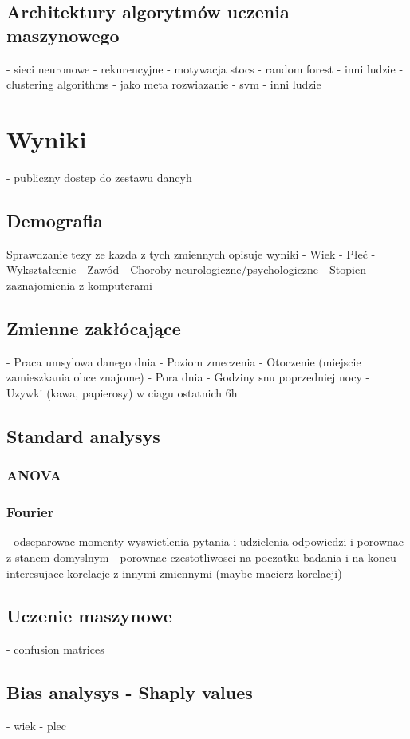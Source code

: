 \documentclass{./assets/wfis}
\begin{document}
\section{Architektury algorytmów uczenia maszynowego}
- sieci neuronowe
    - rekurencyjne - motywacja stocs
- random forest - inni ludzie
- clustering algorithms - jako meta rozwiazanie
- svm - inni ludzie

\chapter{Wyniki}
- publiczny dostep do zestawu dancyh
\section{Demografia}
Sprawdzanie tezy ze kazda z tych zmiennych opisuje wyniki
- Wiek
- Płeć
- Wykształcenie
- Zawód
- Choroby neurologiczne/psychologiczne
- Stopien zaznajomienia z komputerami
\section{Zmienne zakłócające}\label{zmiennne-zaklucajace}
- Praca umsylowa danego dnia
- Poziom zmeczenia
- Otoczenie (miejscie zamieszkania obce znajome)
- Pora dnia
- Godziny snu poprzedniej nocy
- Uzywki (kawa, papierosy) w ciagu ostatnich 6h
\section{Standard analysys}\label{analiza-klasyczna}
\subsection{ANOVA}
\subsection{Fourier}
- odseparowac momenty wyswietlenia pytania i udzielenia odpowiedzi i porownac z stanem domyslnym
- porownac czestotliwosci na poczatku badania i na koncu
- interesujace korelacje z innymi zmiennymi (maybe macierz korelacji)
\section{Uczenie maszynowe}\label{uczenie-maszynowe}
- confusion matrices
\section{Bias analysys - Shaply values}\label{bias}
- wiek
- plec
\end{document}
